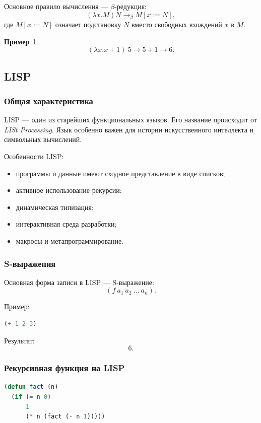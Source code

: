 \documentclass[12pt,a4paper]{article}
\newtheorem{example}{Пример}
\begin{document}
Основное правило вычисления --- $\beta$-редукция:
$$
(\lambda x.M)N \to_\beta M[x := N],
$$
где $M[x := N]$ означает подстановку $N$ вместо свободных вхождений $x$ в $M$.

\begin{example}
$$
(\lambda x. x + 1)\ 5 \to 5 + 1 \to 6.
$$
\end{example}

\subsection{LISP}

\subsubsection{Общая характеристика}

LISP --- один из старейших функциональных языков. Его название происходит от \emph{LISt Processing}. Язык особенно важен для истории искусственного интеллекта и символьных вычислений.

Особенности LISP:
\begin{itemize}
    \item программы и данные имеют сходное представление в виде списков;
    \item активное использование рекурсии;
    \item динамическая типизация;
    \item интерактивная среда разработки;
    \item макросы и метапрограммирование.
\end{itemize}

\subsubsection{S-выражения}

Основная форма записи в LISP --- S-выражение:
$$
(f\ a_1\ a_2\ \dots\ a_n).
$$

Пример:
\begin{lstlisting}[language=Lisp]
(+ 1 2 3)
\end{lstlisting}

Результат:
$$
6.
$$

\subsubsection{Рекурсивная функция на LISP}

\begin{lstlisting}[language=Lisp]
(defun fact (n)
  (if (= n 0)
      1
      (* n (fact (- n 1)))))
\end{lstlisting}
\end{document}
